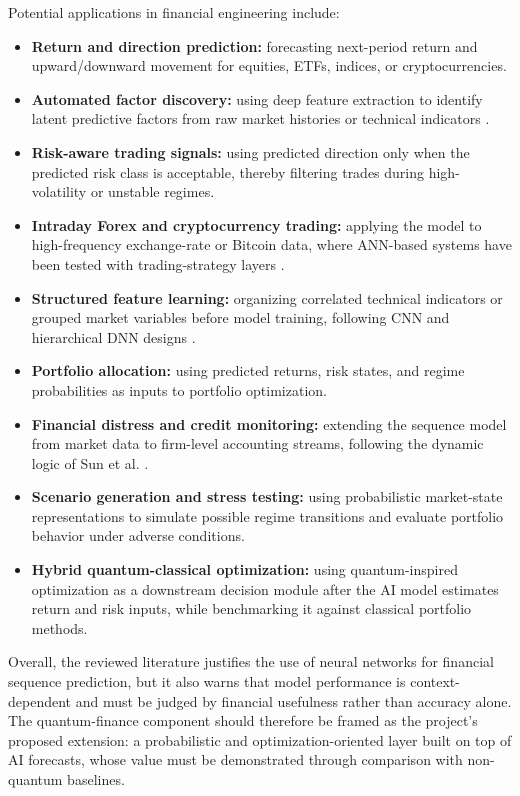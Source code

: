 \documentclass[conference]{IEEEtran}
\begin{document}
Potential applications in financial engineering include:
\begin{itemize}
    \item \textbf{Return and direction prediction:} forecasting next-period return and upward/downward movement for equities, ETFs, indices, or cryptocurrencies.
    \item \textbf{Automated factor discovery:} using deep feature extraction to identify latent predictive factors from raw market histories or technical indicators \cite{chong2017deep,bao2017deep}.
    \item \textbf{Risk-aware trading signals:} using predicted direction only when the predicted risk class is acceptable, thereby filtering trades during high-volatility or unstable regimes.
    \item \textbf{Intraday Forex and cryptocurrency trading:} applying the model to high-frequency exchange-rate or Bitcoin data, where ANN-based systems have been tested with trading-strategy layers \cite{evans2013utilizing,nakano2018bitcoin}.
    \item \textbf{Structured feature learning:} organizing correlated technical indicators or grouped market variables before model training, following CNN and hierarchical DNN designs \cite{gunduz2017intraday,lachiheb2018hierarchical}.
    \item \textbf{Portfolio allocation:} using predicted returns, risk states, and regime probabilities as inputs to portfolio optimization.
    \item \textbf{Financial distress and credit monitoring:} extending the sequence model from market data to firm-level accounting streams, following the dynamic logic of Sun et al. \cite{sun2011sffs}.
    \item \textbf{Scenario generation and stress testing:} using probabilistic market-state representations to simulate possible regime transitions and evaluate portfolio behavior under adverse conditions.
    \item \textbf{Hybrid quantum-classical optimization:} using quantum-inspired optimization as a downstream decision module after the AI model estimates return and risk inputs, while benchmarking it against classical portfolio methods.
\end{itemize}

Overall, the reviewed literature justifies the use of neural networks for financial sequence prediction, but it also warns that model performance is context-dependent and must be judged by financial usefulness rather than accuracy alone. The quantum-finance component should therefore be framed as the project's proposed extension: a probabilistic and optimization-oriented layer built on top of AI forecasts, whose value must be demonstrated through comparison with non-quantum baselines.
\end{document}

